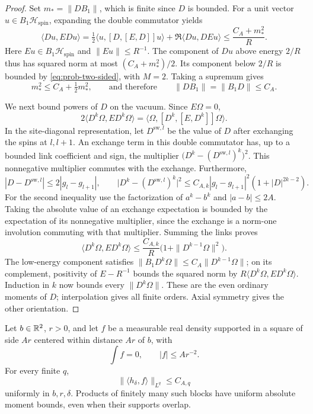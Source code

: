 \begin{proof}
Set \(m_* =\|DB_1\|\), which is finite since \(D\) is bounded.
For a unit vector \(u\in B_1\mathcal H_{\mathrm{spin}}\), expanding the double
commutator yields
\[
 \langle Du,EDu\rangle
 =\tfrac12\langle u,[D,[E,D]]u\rangle
      +\Re\langle Du,DEu\rangle
 \le \frac{C_A+m_*^2}{R}.
\]
Here \(Eu\in B_1\mathcal H_{\mathrm{spin}}\) and \(\|Eu\|\le R^{-1}\).
The component of \(Du\) above energy \(2/R\) thus has squared norm at
most \((C_A+m_*^2)/2\). Its component below \(2/R\) is bounded by
\eqref{eq:prob-two-sided}, with \(M=2\). Taking a supremum gives
\[
 m_*^2\le C_A+\tfrac12m_*^2,
 \qquad\text{and therefore}\qquad
 \|DB_1\|=\|B_1D\|\le C_A.
\]

We next bound powers of \(D\) on the vacuum. Since \(E\Omega=0\),
\[
 2\langle D^k\Omega,ED^k\Omega\rangle
 =\langle\Omega,[D^k,[E,D^k]]\Omega\rangle.
\]
In the site-diagonal representation, let \(D^{\mathrm{sw},l}\) be the
value of \(D\) after exchanging the spins at \(l,l+1\). An exchange
term in this double commutator has, up to a bounded link coefficient
and sign, the multiplier
\(\bigl(D^k-(D^{\mathrm{sw},l})^k\bigr)^2\).
This nonnegative multiplier commutes with the exchange. Furthermore,
\[
 |D-D^{\mathrm{sw},l}|\le2|g_l-g_{l+1}|,
 \qquad
 \bigl|D^k-(D^{\mathrm{sw},l})^k\bigr|^2
 \le C_{A,k}|g_l-g_{l+1}|^2(1+|D|^{2k-2}).
\]
For the second inequality use the factorization of \(a^k-b^k\) and
\(|a-b|\le2A\). Taking the absolute value of an exchange expectation
is bounded by the expectation of its nonnegative multiplier, since the
exchange is a norm-one involution commuting with that multiplier.
Summing the links proves
\begin{equation}\label{eq:prob-power-energy}
 \langle D^k\Omega,ED^k\Omega\rangle
 \le \frac{C_{A,k}}R
       \bigl(1+\|D^{k-1}\Omega\|^2\bigr).
\end{equation}
The low-energy component satisfies
\(\|B_1D^k\Omega\|\le C_A\|D^{k-1}\Omega\|\); on its complement,
positivity of \(E-R^{-1}\) bounds the squared norm by
\(R\langle D^k\Omega,ED^k\Omega\rangle\).
Induction in \(k\) now bounds every \(\|D^k\Omega\|\).
These are the even ordinary moments of \(D\); interpolation gives all
finite orders. Axial symmetry gives the other orientation.
\end{proof}

\begin{corollary}\label{cor:neutral-blocks}
Let \(b\in\mathbb R^2\), \(r>0\), and let \(f\) be a measurable real density
supported in a square of side \(Ar\) centered within distance \(Ar\)
of \(b\), with
\[
 \int f=0,\qquad |f|\le A r^{-2}.
\]
For every finite \(q\),
\begin{equation}\label{eq:prob-neutral-block}
 \|\langle h_\delta,f\rangle\|_{L^q}\le C_{A,q}
\end{equation}
uniformly in \(b,r,\delta\). Products of finitely many such blocks have
uniform absolute moment bounds, even when their supports overlap.
\end{corollary}

